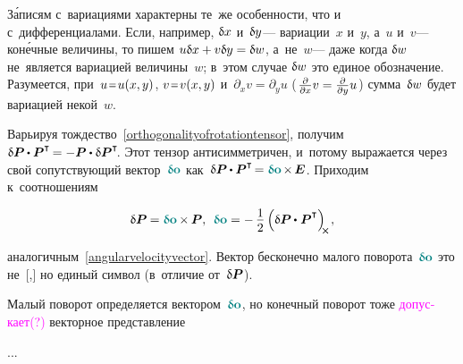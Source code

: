 \begin{otherlanguage}{russian}
{\par}



З\'{а}писям с~вариациями характерны те~же особенности, что и с~дифференциалами.
Если, например, ${\updelta\hspace{-0.1ex}x}$ и~${\updelta\hspace{-0.1ex}y}$\:--- вариации~$x$ и~$y$, а~$u$ и~$v$\:--- кон\'{е}чные величины, то пишем ${u \updelta\hspace{-0.1ex}x + v \updelta\hspace{-0.1ex}y = \updelta\hspace{-0.1ex}w}$, а~не~$w$\:--- даже когда ${\updelta\hspace{-0.1ex}w}$ не~является вариацией величины~$w$; в~этом случае ${\updelta\hspace{-0.1ex}w}$ это единое обозначение.
Разумеется, при~${u \narroweq u(x,y)}$, ${v \narroweq v(x,y)}$ и~${\partial_x v = \partial_y u}$ (${\hspace{.16ex}\frac{\partial}{\partial x} v = \frac{\partial}{\partial y} u\hspace{.16ex}}$) сумма~${\updelta\hspace{-0.1ex}w}$ будет вариацией некой~$w$.

Варьируя тождество~\eqref{orthogonalityofrotationtensor}, получим ${\variation{\bm{P}} \hspace{-0.08ex} \dotp \bm{P}^{\T} \hspace{-0.2ex} = - \bm{P} \dotp \variation{\bm{P}}^{\T}\!}$.
Этот тензор антисимметричен, и~потому выражается через свой сопутствующий вектор~${\varvector{o}}$ как~${\variation{\bm{P}} \hspace{-0.08ex} \dotp \bm{P}^{\T} \hspace{-0.3ex} = \varvector{o} \hspace{-0.2ex} \times \hspace{-0.2ex} \bm{E}}$. Приходим к~соотношениям

\nopagebreak\vspace{-0.5em}\begin{equation}
\variation{\bm{P}} \hspace{-0.1ex} = \varvector{o} \hspace{-0.1ex} \times \hspace{-0.1ex} \bm{P} , \:\:
\varvector{o} = - \, \displaystyle \onehalf \left( { \variation{\bm{P}} \hspace{-0.08ex} \dotp^{\mathstrut} \bm{P}^{\T} } \right)_{\hspace{-0.25em}\Xcompanion} \hspace{-0.1ex} ,
\end{equation}

\vspace{-0.5em} \noindent аналогичным~\eqref{angularvelocityvector}. Вектор бесконечно малого поворота~${\varvector{o}}$ это не~[,] но единый символ (в~отличие от~${\updelta\hspace{-0.1ex}\bm{P}}$).

Малый поворот определяется вектором~${\varvector{o}}$, но конечный поворот тоже \textcolor{magenta}{допускает(?)} векторное представление

...



\end{otherlanguage}

